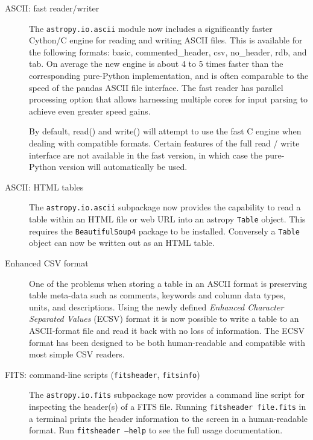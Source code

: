 \documentclass[modern]{aastex61}
\newcommand{\package}[1]{\texttt{#1}\xspace}
\begin{document}
\begin{description}

    \item[ASCII: fast reader/writer]

		The \package{astropy.io.ascii} module now includes a significantly faster
		Cython/C engine for reading and writing ASCII files. This is available
		for the following formats: basic, commented\_header, csv, no\_header,
		rdb, and tab.  On average the new engine is about 4 to 5 times faster
		than the corresponding pure-Python implementation, and is often
		comparable to the speed of the pandas ASCII file interface. The fast
		reader has parallel processing option that allows harnessing multiple
		cores for input parsing to achieve even greater speed gains.

		By default, read() and write() will attempt to use the fast C engine when
		dealing with compatible formats. Certain features of the full read / write
		interface are not available in the fast version, in which case the
		pure-Python version will automatically be used.

    \item[ASCII: HTML tables]

		The \package{astropy.io.ascii} subpackage now provides the capability
		to read a table within an HTML file or web URL into an astropy
		\texttt{Table} object. This requires the \package{BeautifulSoup4}
		package to be installed.  Conversely a \texttt{Table} object can now
		be written out as an HTML table.

	\item [Enhanced CSV format ]

		One of the problems when storing a table in an ASCII format is
		preserving table meta-data such as comments, keywords and column data
		types, units, and descriptions. Using the newly defined \emph{Enhanced
		Character Separated Values} (ECSV) format it is now possible to write
		a table to an ASCII-format file and read it back with no loss of
		information. The ECSV format has been designed to be both
		human-readable and compatible with most simple CSV readers.

	\item [FITS: command-line scripts (\texttt{fitsheader}, \texttt{fitsinfo})]

		The \package{astropy.io.fits} subpackage now provides a command line
		script for inspecting the header(s) of a FITS file.  Running
		\texttt{fitsheader file.fits} in a terminal prints the header
		information to the screen in a human-readable format. Run
		\texttt{fitsheader --help} to see the full usage documentation.


\end{description}
\end{document}
